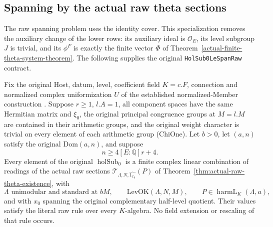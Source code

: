 \subsection{Spanning by the actual raw theta sections}
\label{actual-raw-theta-spanning}

The raw spanning problem uses the identity cover. This specialization
removes the auxiliary change of the lower rows: its auxiliary ideal is
$\mathcal O_E$, its level subgroup $J$ is trivial, and its
$\phi^F$ is exactly the finite vector $\Phi$ of
Theorem~\ref{actual-finite-theta-system-theorem}.
The following supplies the original
\texttt{HolSub0LeSpanRaw} contract.\cite{actual-sw-source}

\begin{theorem}\label{actual-raw-theta-spanning-theorem}
Fix the original Host, datum, level, coefficient field $K=c.F$,
connection and normalized complex uniformization $U$ of
the established normalized-Member construction
\cite{current-construction-record}. Suppose $r\ge1$,
$l.A=1$, all component spaces have the same Hermitian matrix and
$\xi_0$, the original principal congruence groups at $M=l.M$ are
contained in their arithmetic groups, and the original weight
character is trivial on every element of each arithmetic group
($\mathrm{ChiOne}$). Let $b>0$, let $(a,n)$ satisfy the original
$\mathrm{Dom}(a,n)$, and suppose
\[
                        n\ge4[E:\mathbb Q]r+4.
\]
Every element of the original $\operatorname{holSub}_0$ is a
finite complex linear combination of readings of the actual raw
sections $\mathcal T_{\Lambda,N,\widehat{1_{x_0}}}(P)$ of
Theorem~\ref{thm:actual-raw-theta-existence}, with
\[
 \Lambda\text{ unimodular and standard at }bM,\qquad
 \mathrm{LevOK}(\Lambda,N,M),\qquad
 P\in\operatorname{harmL}_K(\Lambda,a),
\]
and with $x_0$ spanning the original complementary half-level
quotient. Their values satisfy the literal raw rule over every
$K$-algebra. No field extension or rescaling of that rule occurs.
\end{theorem}

